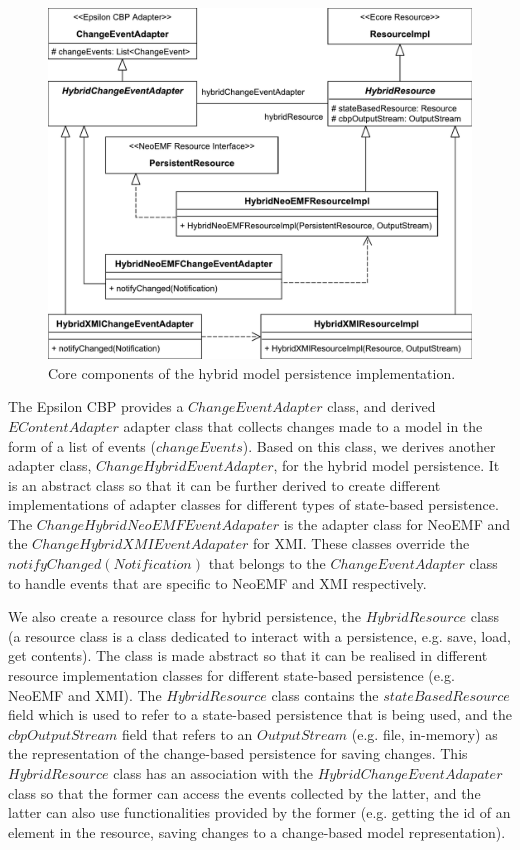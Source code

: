 \documentclass[10pt,conference]{IEEEtran}
\begin{document}
\begin{figure}[ht]
    \includegraphics[width=\linewidth]{images/class_diagram}
    \caption{Core components of the hybrid model persistence implementation.}
    \label{fig:class_diagram}
\end{figure}

The Epsilon CBP provides a $ChangeEventAdapter$ class, and derived $EContentAdapter$ adapter class that collects changes made to a model in the form of a list of events ($changeEvents$). Based on this class, we derives another adapter class, $ChangeHybridEventAdapter$, for the hybrid model persistence. It is an abstract class so that it can be further derived to create different implementations of adapter classes for different types of state-based persistence. The $ChangeHybridNeoEMFEventAdapater$ is the adapter class for NeoEMF and the $ChangeHybridXMIEventAdapater$ for XMI. These classes override the $notifyChanged(Notification)$ that belongs to the $ChangeEventAdapter$ class to handle events that are specific to NeoEMF and XMI respectively. 

We also create a resource class for hybrid persistence, the $HybridResource$ class (a resource class is a class dedicated to interact with a persistence, e.g. save, load, get contents). The class is made abstract so that it can be realised in different resource implementation classes for different state-based persistence (e.g. NeoEMF and XMI). The $HybridResource$ class contains the $stateBasedResource$ field which is used to refer to a state-based persistence that is being used, and the $cbpOutputStream$ field that refers to an $OutputStream$ (e.g. file, in-memory) as the representation of the change-based persistence for saving changes. This $HybridResource$ class has an association with the $HybridChangeEventAdapater$ class so that the former can access the events collected by the latter, and the latter can also use functionalities provided by the former (e.g. getting the id of an element in the resource, saving changes to a change-based model representation).
\end{document}
